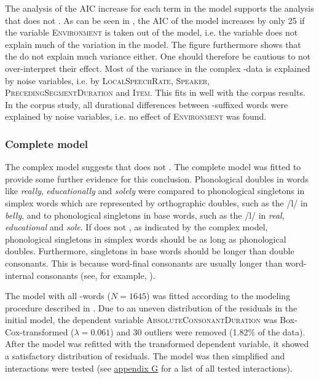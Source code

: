The analysis of the AIC increase for each term in the model supports the analysis that  does not . As can be seen in , the AIC of the model increases by only 25 if the variable \textsc{Environment} is taken out of the model, i.e. the variable does not explain much of the variation in the model.
The figure furthermore shows that the  do not explain much variance either. One should therefore be cautious to not over-interpret their effect. 
Most of the variance in the complex -data is explained by noise variables, i.e. by \textsc{LocalSpeechRate}, \textsc{Speaker}, \textsc{PrecedingSegmentDuration} and \textsc{Item}. This fits in well with the corpus results. In the corpus study, all durational differences between -suffixed words were explained by noise variables, i.e. no effect of \textsc{Environment} was found.




\subsubsection{Complete model}

The complex model suggests that  does not . The complete model was fitted to provide some further evidence for this conclusion. Phonological doubles in words like \textit{really}, \textit{educationally} and \textit{solely} were compared to phonological singletons in simplex words which are represented by orthographic doubles, such as the /l/ in \textit{belly}, and to phonological singletons in base words, such as the /l/ in \textit{real}, \textit{educational} and \textit{sole}. 
If  does not , as indicated by the complex model, phonological singletons in simplex words should be as long as phonological doubles. Furthermore, singletons in base words should be longer than double consonants. This is because word-final consonants are usually longer than word-internal consonants (see, for example,  \citealt{Berkovits.1993,Oller.1973,Umeda.1977}). 


The model with all -words ($N=1645$) was fitted according to the modeling procedure described in . Due to an uneven distribution of the residuals in the initial model, the dependent variable \textsc{AbsoluteConsonantDuration} was Box-Cox-transformed ($\lambda = 0.061$) and 30 outliers were removed (1.82\% of the data).
After the model was refitted with the transformed dependent variable, it showed a satisfactory distribution of residuals.  The model was then simplified and interactions were tested (see \hyperref[Appendix G Summaries of tested interactions in experimental study]{appendix G} for a list of all tested interactions).



